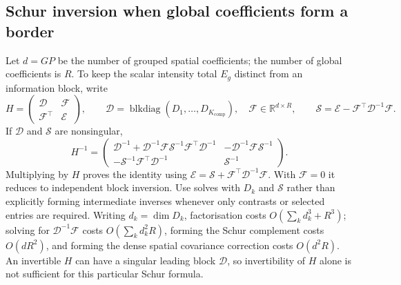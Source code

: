 \documentclass[11pt,a4paper]{article}
\newcommand{\R}{\mathbb{R}}
\newcommand{\blkdiag}{\operatorname{blkdiag}}
\numberwithin{equation}{section}
\begin{document}
\subsection{Schur inversion when global coefficients form a border}
Let $d=GP$ be the number of grouped spatial coefficients; the number of
global coefficients is $R$. To keep the scalar intensity total $E_g$
distinct from an information block, write
\begin{equation}
 H=\begin{pmatrix}\mathcal D&\mathcal F\\
                 \mathcal F^\top&\mathcal E\end{pmatrix},\qquad
 \mathcal D=\blkdiag(D_1,\ldots,D_{K_{\mathrm{comp}}}),\quad
 \mathcal F\in\R^{d\times R},\qquad
 \mathcal S=\mathcal E-\mathcal F^\top\mathcal D^{-1}\mathcal F.
\end{equation}
If $\mathcal D$ and $\mathcal S$ are nonsingular,
\begin{equation}\label{eq:schur}
 H^{-1}=
 \begin{pmatrix}
 \mathcal D^{-1}+\mathcal D^{-1}\mathcal F\mathcal S^{-1}
                 \mathcal F^\top\mathcal D^{-1}
 &-\mathcal D^{-1}\mathcal F\mathcal S^{-1}\\
 -\mathcal S^{-1}\mathcal F^\top\mathcal D^{-1}&\mathcal S^{-1}
 \end{pmatrix}.
\end{equation}
Multiplying by $H$ proves the identity using
$\mathcal E=\mathcal S+\mathcal F^\top\mathcal D^{-1}\mathcal F$.
With $\mathcal F=0$ it reduces to independent
block inversion. Use solves with $D_k$ and $\mathcal S$ rather than explicitly
forming intermediate inverses whenever only contrasts or selected entries
are required.
Writing $d_k=\dim D_k$, factorisation costs
$O(\sum_kd_k^3+R^3)$; solving for $\mathcal D^{-1}\mathcal F$ costs
$O(\sum_kd_k^2R)$, forming the Schur complement costs $O(dR^2)$, and forming
the dense spatial covariance correction costs $O(d^2R)$.
An invertible $H$ can have a singular leading block $\mathcal D$, so invertibility of
$H$ alone is not sufficient for this particular Schur formula.
\end{document}
